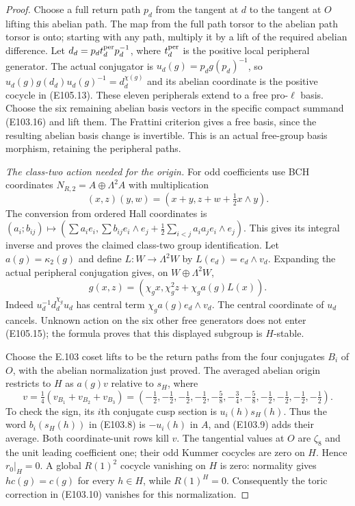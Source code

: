 \begin{proof}
Choose a full return path $p_d$ from the tangent at $d$ to
the tangent at $O$ lifting this abelian path.  The map from
the full path torsor to the abelian path torsor is onto;
starting with any path, multiply it by a lift of the required
abelian difference.  Let $d_d=p_d t_d^{\rm per}p_d^{-1}$,
where $t_d^{\rm per}$ is the positive local peripheral
generator.  The actual conjugator is
$u_d(g)=p_dg(p_d)^{-1}$, so
$u_d(g)g(d_d)u_d(g)^{-1}=d_d^{\chi(g)}$ and its abelian
coordinate is the positive cocycle in (E105.13).
These eleven peripherals extend to a free pro-$\ell$ basis.
Choose the six remaining abelian basis vectors in the
specific compact summand (E103.16) and lift them.  The
Frattini criterion gives a free basis, since the resulting
abelian basis change is invertible.  This is an actual
free-group basis morphism, retaining the peripheral paths.

\emph{The class-two action needed for the origin.}
For odd coefficients use BCH coordinates
$N_{R,2}=A\oplus\Lambda^2 A$ with multiplication
\[
 (x,z)(y,w)=(x+y,z+w+\tfrac12x\wedge y).
 \tag{E105.14}
\]
The conversion from ordered Hall coordinates is
$(a_i;b_{ij})\mapsto
(\sum a_ie_i,\sum b_{ij}e_i\wedge e_j+
\tfrac12\sum_{i<j}a_i a_j e_i\wedge e_j)$.
This gives its integral inverse and proves the claimed
class-two group identification.
Let $a(g)=\kappa_2(g)$ and define
$L:W\to\Lambda^2W$ by $L(e_d)=e_d\wedge v_d$.
Expanding the actual peripheral conjugation gives, on
$W\oplus\Lambda^2W$,
\[
 g(x,z)=(\chi_gx,\chi_g^2z+\chi_g a(g)L(x)).
 \tag{E105.15}
\]
Indeed $u_d^{-1}d_d^{\chi_g}u_d$ has central term
$\chi_g a(g)e_d\wedge v_d$.
The central coordinate of $u_d$ cancels.
Unknown action on the six other free generators does not
enter (E105.15); the formula proves that this displayed
subgroup is $H$-stable.

Choose the E.103 coset lifts to be the return paths from
the four conjugates $B_i$ of $O$, with the abelian
normalization just proved.  The averaged abelian origin
restricts to $H$ as $a(g)v$ relative to $s_H$, where
\[
 v=\tfrac14(v_{B_1}+v_{B_2}+v_{B_3})
   =\left(-\tfrac12,-\tfrac12,-\tfrac12,-\tfrac12,
          -\tfrac58,-\tfrac34,-\tfrac58,
          -\tfrac12,-\tfrac12,-\tfrac12,-\tfrac12\right).
 \tag{E105.16}
\]
To check the sign, its $i$th conjugate cusp section is
$u_i(h)s_H(h)$.  Thus the word $b_i(s_H(h))$ in
(E103.8) is $-u_i(h)$ in $A$, and (E103.9) adds their
average.  Both coordinate-unit rows kill $v$.
The tangential values at $O$ are $\zeta_8$ and the unit
leading coefficient one; their odd Kummer cocycles are
zero on $H$.  Hence $r_0|_H=0$.
A global $R(1)^2$ cocycle vanishing on $H$ is zero:
normality gives $h c(g)=c(g)$ for every $h\in H$, while
$R(1)^H=0$.  Consequently the toric correction in
(E103.10) vanishes for this normalization.


\end{proof}
